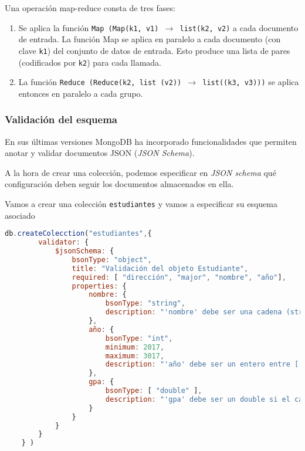 Una operación map-reduce consta de tres fases:
\begin{enumerate}[label=\arabic*)]
	\item Se aplica la función \texttt{Map (Map(k1, v1) $\rightarrow$ list(k2, v2)} a cada documento de entrada. La función Map se aplica en paralelo a cada documento (con clave \texttt{k1}) del conjunto de datos de entrada. Esto produce una lista de pares (codificados por \texttt{k2}) para cada llamada.
	\item La función \texttt{Reduce (Reduce(k2, list (v2)) $\rightarrow$ list((k3, v3)))} se aplica entonces en paralelo a cada grupo.
\end{enumerate}
\subsubsection{Validación del esquema}
En sus últimas versiones MongoDB ha incorporado funcionalidades que permiten anotar y validar documentos JSON (\textit{JSON Schema}).

A la hora de crear una colección, podemos especificar en \textit{JSON schema} qué configuración deben seguir los documentos almacenados en ella.

\Ej 

Vamos a crear una colección \texttt{estudiantes} y vamos a especificar su esquema asociado

\begin{lstlisting}[language=JavaScript]
	db.createColecction("estudiantes",{
		validator: {
			$jsonSchema: {
				bsonType: "object",
				title: "Validación del objeto Estudiante",
				required: [ "dirección", "major", "nombre", "año"],
				properties: {
					nombre: {
						bsonType: "string",
						description: "'nombre' debe ser una cadena (string) y es obligatorio"
					},
					año: {
						bsonType: "int",
						minimum: 2017,
						maximum: 3017,
						description: "'año' debe ser un entero entre [ 2017, 3017 ] y es obligatorio"
					},
					gpa: {
						bsonType: [ "double" ],
						description: "'gpa' debe ser un double si el campo existe"
					}
				}
			}
		}
	} )
\end{lstlisting}


